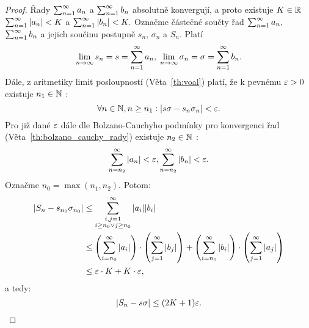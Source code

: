 \begin{proof}
    Řady $\sum_{n=1}^\infty a_n$ a $\sum_{n=1}^\infty b_n$ absolutně konvergují, a proto existuje 
    $K \in \mathbb{R}$ \tz $\sum_{n=1}^\infty |a_n| < K$ a $\sum_{n=1}^\infty |b_n| < K.$
    Označme částečné součty řad $\sum_{n=1}^\infty a_n,$ $\sum_{n=1}^\infty b_n$ a jejich součinu
    postupně $s_n$, $\sigma_n$ a $S_n.$ Platí
    $$\lim_{n \to \infty} s_n = s = \sum_{n=1}^\infty a_n, \; \lim_{n \to \infty} \sigma_n = \sigma = \sum_{n=1}^\infty b_n.$$
    Dále, z aritmetiky limit posloupností (Věta~\ref{th:voal}) platí, že k 
    pevnému $\varepsilon > 0$ existuje $n_1 \in \mathbb{N}$ \tz:
    $$\forall n \in \mathbb{N}, n \geq n_1: |s\sigma - s_n\sigma_n| < \varepsilon.$$
    Pro již dané $\varepsilon$ dále dle Bolzano-Cauchyho podmínky pro konvergenci řad
    (Věta~\ref{th:bolzano_cauchy_rady}) existuje $n_2 \in \mathbb{N}$ \tz:
    $$\sum_{n=n_2}^\infty |a_n| < \varepsilon, \sum_{n=n_2}^\infty |b_n| < \varepsilon.$$
    Označme $n_0 = \max(n_1,n_2).$ Potom:
    \begin{align*}
        |S_n - s_{n_0}\sigma_{n_0}| 
        &\leq \sum_{\substack{i,j=1\\i \geq n_0 \lor j\geq n_0}}^\infty |a_i||b_i| \\
        &\leq \left(\sum_{i=n_0}^\infty|a_i|\right)
              \cdot
              \left(\sum_{j=1}^\infty|b_j|\right) 
              +
              \left(\sum_{i=n_0}^\infty|b_i|\right)
              \cdot
              \left(\sum_{j=1}^\infty|a_j|\right) \\
        &\leq \varepsilon\cdot K + K \cdot \varepsilon,
    \end{align*}
    a tedy:
    $$|S_n - s\sigma| \leq (2K + 1) \varepsilon.$$

\end{proof}
